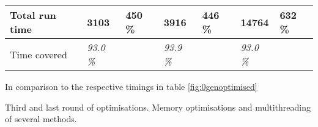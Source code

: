 \begin{threeparttable}[]
{\begin{tabular}{|p{2.8cm}|p{1.9cm}|p{1.4cm}|p{1.9cm}|p{1.4cm}|p{1.8cm}|p{1.5cm}|}
        Total run time  & \textbf{3103} & \textbf{450 \%} & \textbf{3916} & \textbf{446 \%} & \textbf{14764} & \textbf{632 \%} \\ \hline
        Time covered    & \textit{93.0 \%} &     & \textit{93.9 \%} &     & \textit{93.0 \%} &	\\ \hline
    \end{tabular}
    }
    \begin{tablenotes}
        \footnotesize{\item[\textdagger] In comparison to the respective timings in table \ref{fig:0genoptimised}}
    \end{tablenotes}
    \caption{Third and last round of optimisations. Memory optimisations and multithreading of several methods.}
    \label{fig:3genoptimised}
\end{threeparttable}